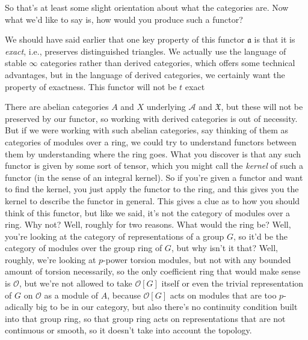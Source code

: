 \documentclass[reqno]{amsart} 
\begin{document}
So that's at least some slight orientation about what the categories are.  Now what we'd like to say is, how would you produce such a functor?  

We should have said earlier that one key property of this functor $\mathfrak{a}$ is that it is \emph{exact}, i.e., preserves distinguished triangles.  We actually use the language of stable $\infty$ categories rather than derived categories, which offers some technical advantages, but in the language of derived categories, we certainly want the property of exactness.  This functor will not be $t$ exact

There are abelian categories $A$ and $X$ underlying $\mathcal{A}$ and $\mathfrak{X}$, but these will not be preserved by our functor, so working with derived categories is out of necessity.  But if we were working with such abelian categories, say thinking of them as categories of modules over a ring, we could try to understand functors between them by understanding where the ring goes.  What you discover is that any such functor is given by some sort of tensor, which you might call the \emph{kernel} of such a functor (in the sense of an integral kernel).  So if you're given a functor and want to find the kernel, you just apply the functor to the ring, and this gives you the kernel to describe the functor in general.  This gives a clue as to how you should think  of this functor, but like we said, it's not the category of modules over a ring.  Why not?  Well, roughly for two reasons.  What would the ring be?  Well, you're looking at the category of representations of a group $G$, so it'd be the category of modules over the group ring of $G$, but why isn't it that?  Well, roughly, we're looking at $p$-power torsion modules, but not with any bounded amount of torsion necessarily, so the only coefficient ring that would make sense is $\mathcal{O}$, but we're not allowed to take $\mathcal{O}[G]$ itself or even the trivial representation of $G$ on $\mathcal{O}$ as a module of $A$, because $\mathcal{O} [G]$ acts on modules that are too $p$-adically big to be in our category, but also there's no continuity condition built into that group ring, so that group ring acts on representations that are not continuous or smooth, so it doesn't take into account the topology.
\end{document}
